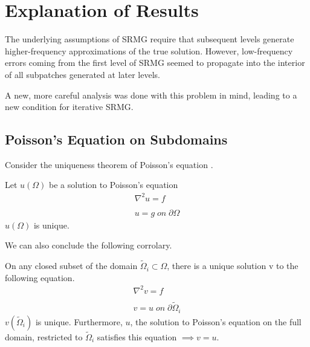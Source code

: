 \documentclass[final]{siamart1116}
\numberwithin{theorem}{section}
\begin{document}
\section{Explanation of Results}
The underlying assumptions of SRMG require that subsequent levels generate higher-frequency approximations of the true solution. However, low-frequency errors coming from the first level of SRMG seemed to propagate into the interior of all subpatches generated at later levels.  

A new, more careful analysis was done with this problem in mind, leading to a new condition for iterative SRMG.



\subsection{Poisson's Equation on Subdomains}

Consider the uniqueness theorem of Poisson's equation \cite{poissonunique}.

\begin{theorem}
Let $u(\Omega)$ be a solution to Poisson's equation
\begin{align*} 
\nabla^2 u = f\\
\\ u = g \; on \; \partial \Omega 
\end{align*}
$u(\Omega)$ is unique. 
\end{theorem}

 We can also conclude the following corrolary. 

\begin{corollary}
\label{corollaryunique}
On any closed subset of the domain $\tilde{\Omega}_i \subset \Omega$, there is a unique solution v to the following equation. 
\begin{align*} 
\nabla^2 v = f\\
\\ v = u \; on \; \partial \tilde{\Omega}_i 
\end{align*}
$v(\tilde{\Omega}_i)$ is unique. 
Furthermore, $u$, the solution to Poisson's equation on the full domain, restricted to $\tilde{\Omega}_i$ satisfies this equation $\implies v = u$. 
\end{corollary}

\end{document}
